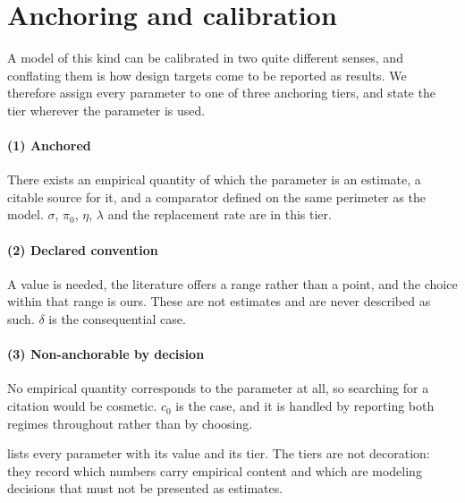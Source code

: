 
\section{Anchoring and calibration}
\label{sec:calibration}

A model of this kind can be calibrated in two quite different senses, and
conflating them is how design targets come to be reported as results. We
therefore assign every parameter to one of three anchoring tiers, and
state the tier wherever the parameter is used.

\paragraph{(1) Anchored} There exists an empirical quantity of which the
parameter is an estimate, a citable source for it, and a comparator defined
on the same perimeter as the model. $\sigma$, $\pi_0$, $\eta$, $\lambda$ and
the replacement rate are in this tier. \paragraph{(2) Declared convention} A
value is needed, the literature offers a range rather than a point, and the
choice within that range is ours. These are not estimates and are never
described as such. $\delta$ is the consequential case. \paragraph{(3) Non-anchorable by decision} No empirical quantity corresponds to the
parameter at all, so searching for a citation would be cosmetic. $c_0$ is the
case, and it is handled by reporting both regimes throughout rather than by
choosing.

 lists every parameter with its value and its tier. The tiers
are not decoration: they record which numbers carry empirical content and which
are modeling decisions that must not be presented as estimates.

